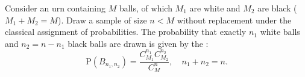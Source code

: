 Consider an urn containing $M$ balls, of which $M_1$ are white and $M_2$ are black ($M_1 + M_2 = M$). Draw a sample of size $n < M$ without replacement under the classical assignment of probabilities. The probability that exactly $n_1$ white balls and $n_2 = n - n_1$ black balls are drawn is given by the :
$$\text{P}(B_{n_1, n_2}) = \frac{C_{M_1}^{n_1} C_{M_2}^{n_2}}{C_M^n}, \quad n_1 + n_2 = n.$$
